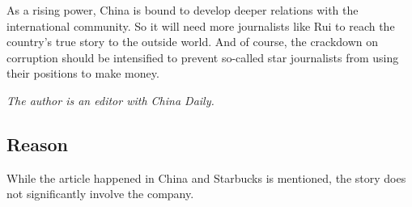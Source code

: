 \begin{displayquote}
	As a rising power, China is bound to develop deeper relations with the
	international community. So it will need more journalists like Rui to
	reach the country's true story to the outside world. And of course, the
	crackdown on corruption should be intensified to prevent so-called star
	journalists from using their positions to make money.

	\textit{The author is an editor with China Daily.}

\end{displayquote}

\subsection{Reason}

While the article happened in China and Starbucks is mentioned, the story does
not significantly involve the company.

